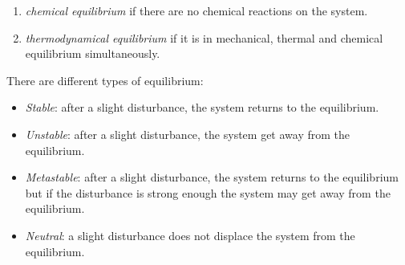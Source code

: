 \documentclass[../../../main.tex]{subfiles}
\begin{document}
\begin{multicols}{2}
\begin{definition}
\begin{enumerate}
            \item \textit{chemical equilibrium} if there are no chemical reactions on the system.
            \item \textit{thermodynamical equilibrium} if it is in mechanical, thermal and chemical equilibrium simultaneously.
        \end{enumerate}
    \end{definition}
    \begin{definition}
        There are different types of equilibrium:
        \begin{itemize}
            \item \textit{Stable}: after a slight disturbance, the system returns to the equilibrium.
            \item \textit{Unstable}: after a slight disturbance, the system get away from the equilibrium.
            \item \textit{Metastable}: after a slight disturbance, the system returns to the equilibrium but if the disturbance is strong enough the system may get away from the equilibrium.
            \item \textit{Neutral}: a slight disturbance does not displace the system from the equilibrium.
        \end{itemize}
        \begin{center}
            \begin{minipage}{0.24\linewidth}
                \centering
                
            \end{minipage}
            \begin{minipage}{0.24\linewidth}
                \centering
                
            \end{minipage}
            \begin{minipage}{0.24\linewidth}
                \centering
                
            \end{minipage}
            \begin{minipage}{0.24\linewidth}
                \centering
                

\end{minipage}
\end{center}
\end{definition}
\end{multicols}
\end{document}
